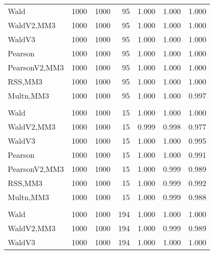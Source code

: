 \documentclass[
]{article}
\begin{document}
\begin{table}[H]
{\begin{tabular}[t]{lrrrrrr}
\hspace{1em}Wald & 1000 & 1000 & 95 & 1.000 & 1.000 & 1.000\\
\hspace{1em}WaldV2,MM3 & 1000 & 1000 & 95 & 1.000 & 1.000 & 1.000\\
\hspace{1em}WaldV3 & 1000 & 1000 & 95 & 1.000 & 1.000 & 1.000\\
\hspace{1em}Pearson & 1000 & 1000 & 95 & 1.000 & 1.000 & 1.000\\
\hspace{1em}PearsonV2,MM3 & 1000 & 1000 & 95 & 1.000 & 1.000 & 1.000\\
\hspace{1em}RSS,MM3 & 1000 & 1000 & 95 & 1.000 & 1.000 & 1.000\\
\hspace{1em}Multn,MM3 & 1000 & 1000 & 95 & 1.000 & 1.000 & 0.997\\
\addlinespace[0.3em]
\multicolumn{7}{l}{\textbf{2F 10V}}\\
\hspace{1em}Wald & 1000 & 1000 & 15 & 1.000 & 1.000 & 1.000\\
\hspace{1em}WaldV2,MM3 & 1000 & 1000 & 15 & 0.999 & 0.998 & 0.977\\
\hspace{1em}WaldV3 & 1000 & 1000 & 15 & 1.000 & 1.000 & 0.995\\
\hspace{1em}Pearson & 1000 & 1000 & 15 & 1.000 & 1.000 & 0.991\\
\hspace{1em}PearsonV2,MM3 & 1000 & 1000 & 15 & 1.000 & 0.999 & 0.989\\
\hspace{1em}RSS,MM3 & 1000 & 1000 & 15 & 1.000 & 0.999 & 0.992\\
\hspace{1em}Multn,MM3 & 1000 & 1000 & 15 & 1.000 & 0.999 & 0.988\\
\addlinespace[0.3em]
\multicolumn{7}{l}{\textbf{3F 15V}}\\
\hspace{1em}Wald & 1000 & 1000 & 194 & 1.000 & 1.000 & 1.000\\
\hspace{1em}WaldV2,MM3 & 1000 & 1000 & 194 & 1.000 & 0.999 & 0.989\\
\hspace{1em}WaldV3 & 1000 & 1000 & 194 & 1.000 & 1.000 & 1.000\\

\end{tabular}}
\end{table}
\end{document}
